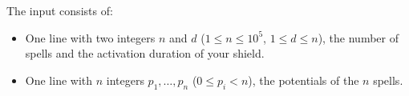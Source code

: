 
	The input consists of:
	\begin{itemize}
		\item One line with two integers $n$ and $d$ ($1 \leq n \leq 10^5$, $1 \leq d \leq n$), the number of spells and the activation duration of your shield.
		\item One line with $n$ integers $p_1, \dots, p_n$ ($0 \leq p_i < n$), the potentials of the $n$ spells.
	\end{itemize}
